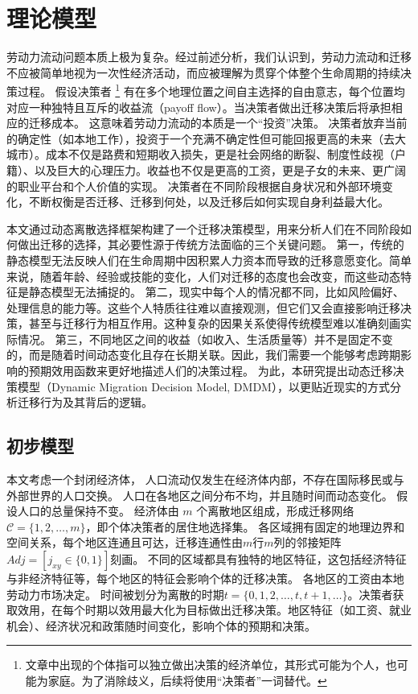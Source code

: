 \documentclass[
  a4paper,
  zihao=-4,
  fontset=mac,
  AutoFakeBold,
  AutoFakeSlant,
  oneside]{ctexbook}
\let\oldfootnote\footnote
\renewcommand{\footnote}[1]{%
  \oldfootnote{\setstretch{1.5}#1}%
}
\begin{document}
\chapter{理论模型}

劳动力流动问题本质上极为复杂。经过前述分析，我们认识到，劳动力流动和迁移不应被简单地视为一次性经济活动，而应被理解为贯穿个体整个生命周期的持续决策过程。
假设决策者\footnote{文章中出现的个体指可以独立做出决策的经济单位，其形式可能为个人，也可能为家庭。为了消除歧义，后续将使用“决策者”一词替代。}有在多个地理位置之间自主选择的自由意志，每个位置均对应一种独特且互斥的收益流（payoff flow）。当决策者做出迁移决策后将承担相应的迁移成本。
这意味着劳动力流动的本质是一个“投资”决策。
决策者放弃当前的确定性（如本地工作），投资于一个充满不确定性但可能回报更高的未来（去大城市）。成本不仅是路费和短期收入损失，更是社会网络的断裂、制度性歧视（户籍）、以及巨大的心理压力。收益也不仅是更高的工资，更是子女的未来、更广阔的职业平台和个人价值的实现。
决策者在不同阶段根据自身状况和外部环境变化，不断权衡是否迁移、迁移到何处，以及迁移后如何实现自身利益最大化。


本文通过动态离散选择框架构建了一个迁移决策模型，用来分析人们在不同阶段如何做出迁移的选择，其必要性源于传统方法面临的三个关键问题。
第一，传统的静态模型无法反映人们在生命周期中因积累人力资本而导致的迁移意愿变化。简单来说，随着年龄、经验或技能的变化，人们对迁移的态度也会改变，而这些动态特征是静态模型无法捕捉的。  
第二，现实中每个人的情况都不同，比如风险偏好、处理信息的能力等。这些个人特质往往难以直接观测，但它们又会直接影响迁移决策，甚至与迁移行为相互作用。这种复杂的因果关系使得传统模型难以准确刻画实际情况。  
第三，不同地区之间的收益（如收入、生活质量等）并不是固定不变的，而是随着时间动态变化且存在长期关联。因此，我们需要一个能够考虑跨期影响的预期效用函数来更好地描述人们的决策过程。  
为此，本研究提出动态迁移决策模型（Dynamic Migration Decision Model, DMDM），以更贴近现实的方式分析迁移行为及其背后的逻辑。

\section{初步模型}

本文考虑一个封闭经济体，
人口流动仅发生在经济体内部，不存在国际移民或与外部世界的人口交换。
人口在各地区之间分布不均，并且随时间而动态变化。
假设人口的总量保持不变。
经济体由 $m$ 个离散地区组成，形成迁移网络$\mathcal{C} = \{1,2,\dots,m\}$，即个体决策者的居住地选择集。
各区域拥有固定的地理边界和空间关系，每个地区连通且可达，迁移连通性由$m$行$m$列的邻接矩阵$Adj=[j_{xy}\in\{0,1\}]$刻画。
不同的区域都具有独特的地区特征，这包括经济特征与非经济特征等，每个地区的特征会影响个体的迁移决策。
各地区的工资由本地劳动力市场决定。
时间被划分为离散的时期$t=\{0,1,2,\ldots,t,t+1,\ldots\}$。决策者获取效用，在每个时期以效用最大化为目标做出迁移决策。地区特征（如工资、就业机会）、经济状况和政策随时间变化，影响个体的预期和决策。
\end{document}
